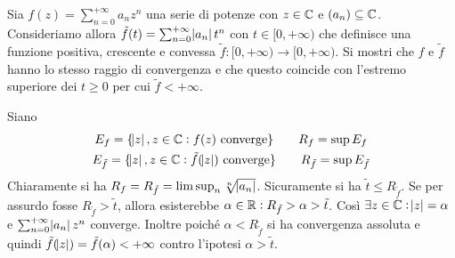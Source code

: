 \begin{es}
  Sia $ f(z) = \sum_{n = 0}^{+\infty} a_n z^n $ una serie di potenze con $ z \in \mathbb{C} $ e $ (a_n) \subseteq \mathbb{C} $. Consideriamo allora $ \tilde{f}(t) = \sum_{n = 0}^{+\infty } \abs{a_n} t^n $ con $ t \in [0, +\infty) $ che definisce una funzione positiva, crescente e convessa $ \tilde{f} \colon [0, +\infty) \to [0, +\infty) $. Si mostri che $ f $ e $ \tilde{f} $ hanno lo stesso raggio di convergenza e che questo coincide con l'estremo superiore dei $ t \geq 0 $ per cui $ \tilde{f} < +\infty $.
\end{es}
%
Siano
\begin{gather*}
  E_f = \{\abs{z}, z \in \mathbb{C} : f(z) \text{ converge}\} \qquad R_f = \sup{E_f} \\
  E_{\tilde{f}} = \{\abs{z}, z \in \mathbb{C} : \tilde{f}(\abs{z}) \text{ converge}\} \qquad R_{\tilde{f}} = \sup{E_{\tilde{f}}}
\end{gather*}
Chiaramente si ha $ R_f = R_{\tilde{f}} = \limsup_n \sqrt[n]{\abs{a_n}} $. Sicuramente si ha $ \tilde{t} \leq R_{\tilde{f}} $. Se per assurdo fosse $ R_{\tilde{f}} > \tilde{t} $, allora esisterebbe $ \alpha \in \mathbb{R} : R_{\tilde{f}} > \alpha > \tilde{t} $. Così $ \exists z \in \mathbb{C} : \abs{z} = \alpha $ e $ \sum_{n = 0}^{+\infty} \abs{a_n} z^n $ converge. Inoltre poiché $ \alpha < R_{\tilde{f}} $ si ha convergenza assoluta e quindi $ \tilde{f}(\abs{z}) = \tilde{f}(\alpha) < +\infty $ contro l'ipotesi $ \alpha > \tilde{t} $.

